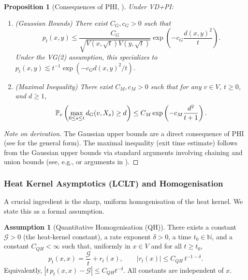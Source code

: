 \documentclass{article}
\numberwithin{equation}{section}
\newtheorem{proposition}[theorem]{Proposition}
\theoremstyle{definition}
\newtheorem{assumption}[theorem]{Assumption}
\theoremstyle{remark}
\newcommand{\cG}{\mathcal{G}}
\newcommand{\N}{\mathbb{N}}
\newcommand{\Prob}{\mathbb{P}}
\begin{document}
\begin{proposition}[Consequences of PHI, \cite{Delmotte99, Grigoryan09}]\label{prop:maximal}
Under VD+PI:
\begin{enumerate}

    \item (Gaussian Bounds) There exist $C_G, c_G > 0$ such that
    \[
    p_t(x,y) \leq \frac{C_G}{\sqrt{V(x,\sqrt{t}) V(y,\sqrt{t})}} \exp\left(-c_G \frac{d(x,y)^2}{t}\right).
    \]
    Under the VG(2) assumption, this specializes to $p_t(x,y) \lesssim t^{-1} \exp(-c_G d(x,y)^2/t)$.
    \item (Maximal Inequality) There exist $C_M,c_M > 0$ such that for any $v \in V$, $t \geq 0$, and $d \geq 1$,
    \begin{equation}\label{eq:max_ineq}
    \small
    \Prob_v\left( \max_{0 \leq s \leq t} d_G(v,X_s) \geq d \right) \leq C_M \exp\left(-c_M \frac{d^2}{t+1}\right).
    \end{equation}
\end{enumerate}
\end{proposition}
\begin{proof}[Note on derivation]
The Gaussian upper bounds are a direct consequence of PHI (see \cite{Delmotte99} for the general form). The maximal inequality (exit time estimate) follows from the Gaussian upper bounds via standard arguments involving chaining and union bounds (see, e.g., \cite[Theorem 5.5.3]{Grigoryan09} or arguments in \cite{Delmotte99}).
\end{proof}


\subsubsection{Heat Kernel Asymptotics (LCLT) and Homogenisation}
A crucial ingredient is the sharp, uniform homogenisation of the heat kernel. We state this as a formal assumption.

\begin{assumption}[Quantitative Homogenisation (QH)]\label{ass:QH}
There exists a constant $\cG > 0$ (the heat-kernel constant), a rate exponent $\delta>0$, a time $t_0\in\N$, and a constant $C_{QH}<\infty$ such that, uniformly in $x\in V$ and for all $t\ge t_0$,
\begin{equation}\label{eq:return-prob}
  p_t(x,x) = \frac{\cG}{t} + r_t(x),\qquad |r_t(x)| \le C_{QH}\, t^{-1-\delta}.
\end{equation}
Equivalently, $|t\,p_t(x,x)-\cG|\le C_{QH} t^{-\delta}$. All constants are independent of $x$.
\end{assumption}
\end{document}
